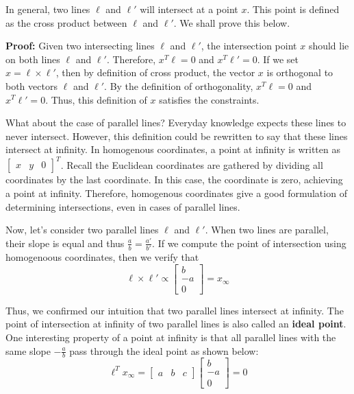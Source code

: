 \documentclass[a4paper, 12pt]{article}
\renewcommand\emph{\textbf}
\begin{document}
In general, two lines $\ell$ and $\ell'$ will intersect at a point $x$. This point is defined as the cross product between $\ell$ and $\ell'$. We shall prove this below.

\textbf{Proof:} Given two intersecting lines $\ell$ and $\ell'$, the intersection point $x$ should lie on both lines $\ell$ and $\ell'$. Therefore, $x^T \ell = 0$ and $x^T\ell' = 0$. If we set $x = \ell \times \ell'$, then by definition of cross product, the vector $x$ is orthogonal to both vectors $\ell$ and $\ell'$. By the definition of orthogonality, $x^T \ell = 0$ and $x^T\ell' = 0$. Thus, this definition of $x$ satisfies the constraints. 

What about the case of parallel lines? Everyday knowledge expects these lines to never intersect. However, this definition could be rewritten to say that these lines intersect at infinity. In homogenous coordinates, a point at infinity is written as $\begin{bmatrix}x & y & 0\end{bmatrix}^T$. Recall the Euclidean coordinates are gathered by dividing all coordinates by the last coordinate. In this case, the coordinate is zero, achieving a point at infinity. Therefore, homogenous coordinates give a good formulation of determining intersections, even in cases of parallel lines.

Now, let's consider two parallel lines $\ell$ and $\ell'$. When two lines are parallel, their slope is equal and thus $\frac{a}{b} = \frac{a'}{b'}$. If we compute the point of intersection using homogenoous coordinates, then we verify that
\begin{equation}
\ell \times \ell' \propto \begin{bmatrix}b \\ -a \\ 0  \end{bmatrix}= x_\infty
\end{equation}

Thus, we confirmed our intuition that two parallel lines intersect at infinity. The point of intersection at infinity of two parallel lines is also called an \emph{ideal point}. One interesting property of a point at infinity is that all parallel lines with the same slope $-\frac{a}{b}$ pass through the ideal point as shown below:
\begin{equation}
\ell ^T x_\infty = \begin{bmatrix}a & b & c\end{bmatrix} \begin{bmatrix}b \\ -a \\ 0\end{bmatrix} = 0
\end{equation}
\end{document}
